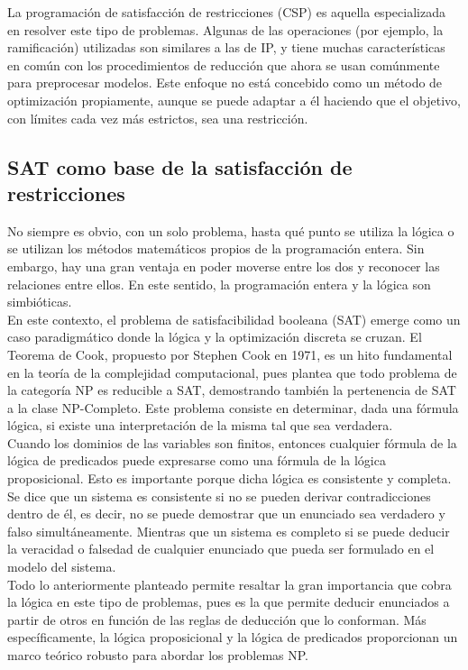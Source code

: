 \documentclass[12pt]{report}
\begin{document}
La programación de satisfacción de restricciones (CSP) es aquella especializada en resolver este tipo de problemas. Algunas de las operaciones (por ejemplo, la ramificación) utilizadas son similares a las de IP, y tiene muchas características en común con los procedimientos de reducción que ahora se usan comúnmente para preprocesar modelos. Este enfoque no está concebido como un método de optimización propiamente, aunque se puede adaptar a él haciendo que el objetivo, con límites cada vez más estrictos, sea una restricción.

\subsection{SAT como base de la satisfacción de restricciones}

No siempre es obvio, con un solo problema, hasta qué punto se utiliza la lógica o se utilizan los métodos matemáticos propios de la programación entera. Sin embargo, hay una gran ventaja en poder moverse entre los dos y reconocer las relaciones entre ellos. En este sentido, la programación entera y la lógica son simbióticas.\\

En este contexto, el problema de satisfacibilidad booleana (SAT) emerge como un caso paradigmático donde la lógica y la optimización discreta se cruzan. El Teorema de Cook, propuesto por Stephen Cook en 1971, es un hito fundamental en la teoría de la complejidad computacional, pues plantea que todo problema de la categoría NP es reducible a SAT, demostrando también la pertenencia de SAT a la clase NP-Completo. Este problema consiste en determinar, dada una fórmula lógica, si existe una interpretación de la misma tal que sea verdadera.\\ 

Cuando los dominios de las variables son finitos, entonces cualquier fórmula de la lógica de predicados puede expresarse como una fórmula de la lógica proposicional. Esto es importante porque dicha lógica es consistente y completa. Se dice que un sistema es consistente si no se pueden derivar contradicciones dentro de él, es decir, no se puede demostrar que un enunciado sea verdadero y falso simultáneamente. Mientras que un sistema es completo si se puede deducir la veracidad o falsedad de cualquier enunciado que pueda ser formulado en el modelo del sistema. \\

Todo lo anteriormente planteado permite resaltar la gran importancia que cobra la lógica en este tipo de problemas, pues es la que permite deducir enunciados a partir de otros en función de las reglas de deducción que lo conforman. Más específicamente, la lógica proposicional y la lógica de predicados proporcionan un marco teórico robusto para abordar los problemas NP.\\
\end{document}
